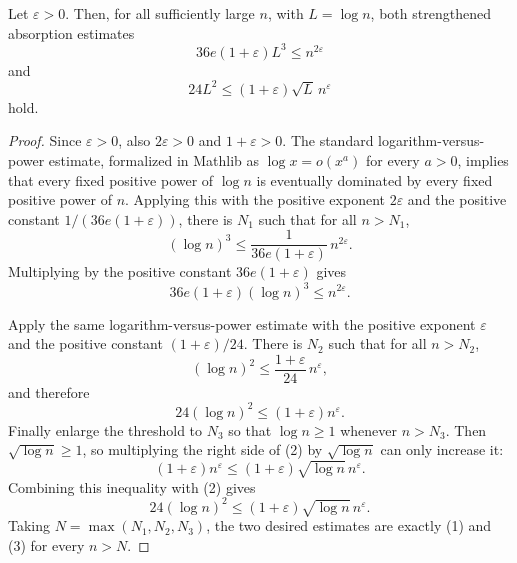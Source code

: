 \begin{lemma}
Let \(\varepsilon>0\).  Then, for all sufficiently large \(n\), with
\(L=\log n\), both strengthened absorption estimates
\[
36e(1+\varepsilon)L^3\le n^{2\varepsilon}
\]
and
\[
24L^2\le (1+\varepsilon)\sqrt L\,n^\varepsilon
\]
hold.
\end{lemma}
\begin{proof}
Since \(\varepsilon>0\), also \(2\varepsilon>0\) and \(1+\varepsilon>0\).
The standard logarithm-versus-power estimate, formalized in Mathlib as
\(\log x=o(x^a)\) for every \(a>0\), implies that every fixed positive power
of \(\log n\) is eventually dominated by every fixed positive power of \(n\).
Applying this with the positive exponent \(2\varepsilon\) and the positive
constant \(1/(36e(1+\varepsilon))\), there is \(N_1\) such that for all
\(n>N_1\),
\[
(\log n)^3\le \frac{1}{36e(1+\varepsilon)}\,n^{2\varepsilon}.
\]
Multiplying by the positive constant \(36e(1+\varepsilon)\) gives
\[
36e(1+\varepsilon)(\log n)^3\le n^{2\varepsilon}. \tag{1}
\]

Apply the same logarithm-versus-power estimate with the positive exponent
\(\varepsilon\) and the positive constant \((1+\varepsilon)/24\).  There is
\(N_2\) such that for all \(n>N_2\),
\[
(\log n)^2\le \frac{1+\varepsilon}{24}\,n^\varepsilon,
\]
and therefore
\[
24(\log n)^2\le (1+\varepsilon)n^\varepsilon. \tag{2}
\]
Finally enlarge the threshold to \(N_3\) so that \(\log n\ge1\) whenever
\(n>N_3\).  Then \(\sqrt{\log n}\ge1\), so multiplying the right side of
(2) by \(\sqrt{\log n}\) can only increase it:
\[
(1+\varepsilon)n^\varepsilon
\le (1+\varepsilon)\sqrt{\log n}\,n^\varepsilon.
\]
Combining this inequality with (2) gives
\[
24(\log n)^2\le (1+\varepsilon)\sqrt{\log n}\,n^\varepsilon. \tag{3}
\]
Taking \(N=\max(N_1,N_2,N_3)\), the two desired estimates are exactly (1)
and (3) for every \(n>N\).
\end{proof}
